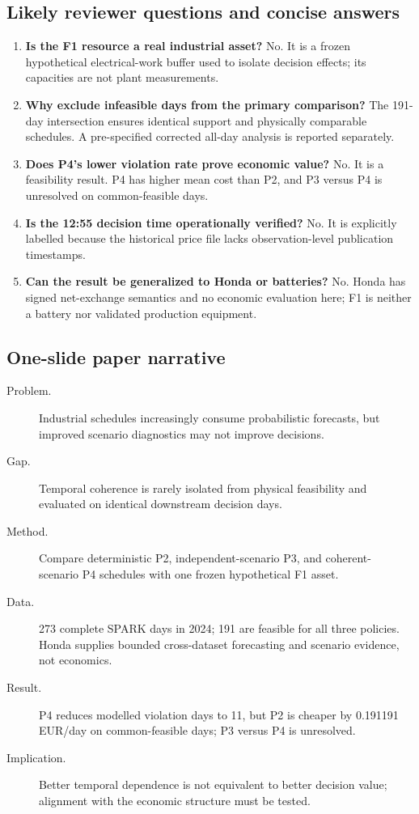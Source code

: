 \documentclass[10pt,twocolumn]{article}
\newcommand{\status}[1]{\texttt{\detokenize{#1}}}
\begin{document}
\subsection{Likely reviewer questions and concise answers}

\begin{enumerate}
  \item \textbf{Is the F1 resource a real industrial asset?} No. It is a frozen
  hypothetical electrical-work buffer used to isolate decision effects; its
  capacities are not plant measurements.
  \item \textbf{Why exclude infeasible days from the primary comparison?} The
  191-day intersection ensures identical support and physically comparable
  schedules. A pre-specified corrected all-day analysis is reported separately.
  \item \textbf{Does P4's lower violation rate prove economic value?} No. It is
  a feasibility result. P4 has higher mean cost than P2, and P3 versus P4 is
  unresolved on common-feasible days.
  \item \textbf{Is the 12:55 decision time operationally verified?} No. It is
  explicitly labelled \status{POST_PUBLICATION_TIMING_ASSUMED} because the
  historical price file lacks observation-level publication timestamps.
  \item \textbf{Can the result be generalized to Honda or batteries?} No.
  Honda has signed net-exchange semantics and no economic evaluation here; F1
  is neither a battery nor validated production equipment.
\end{enumerate}

\subsection{One-slide paper narrative}

\begin{description}
  \item[Problem.] Industrial schedules increasingly consume probabilistic
  forecasts, but improved scenario diagnostics may not improve decisions.
  \item[Gap.] Temporal coherence is rarely isolated from physical feasibility
  and evaluated on identical downstream decision days.
  \item[Method.] Compare deterministic P2, independent-scenario P3, and coherent-
  scenario P4 schedules with one frozen hypothetical F1 asset.
  \item[Data.] 273 complete SPARK days in 2024; 191 are feasible for all three
  policies. Honda supplies bounded cross-dataset forecasting and scenario
  evidence, not economics.
  \item[Result.] P4 reduces modelled violation days to 11, but P2 is cheaper by
  0.191191 EUR/day on common-feasible days; P3 versus P4 is unresolved.
  \item[Implication.] Better temporal dependence is not equivalent to better
  decision value; alignment with the economic structure must be tested.
\end{description}
\end{document}
